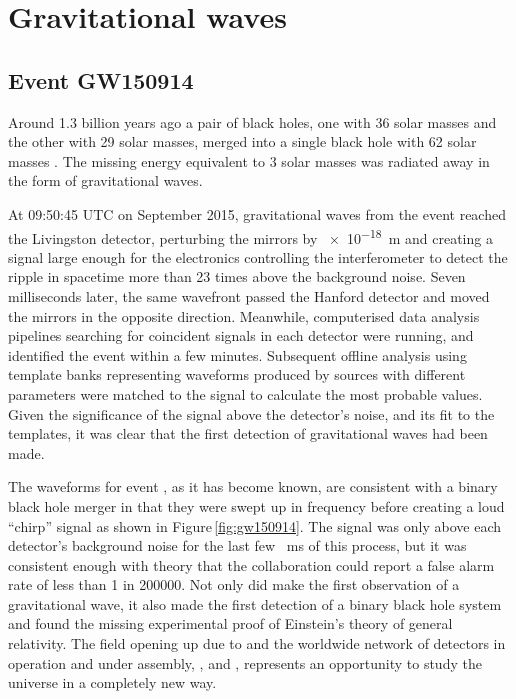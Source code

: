 \chapter{\label{c:gw-detection}Gravitational waves}

\section{Event GW150914}
Around \num{1.3} billion years ago a pair of black holes, one with \num{36} solar masses and the other with \num{29} solar masses, merged into a single black hole with \num{62} solar masses \cite{Abbott2016}. The missing energy equivalent to \num{3} solar masses was radiated away in the form of gravitational waves.

At 09:50:45 \gls{UTC} on  September 2015, gravitational waves from the event reached the \LIGO{} Livingston detector, perturbing the mirrors by \SI{e-18}{\meter} and creating a signal large enough for the electronics controlling the interferometer to detect the ripple in spacetime more than \num{23} times above the background noise. Seven milliseconds later, the same wavefront passed the \LIGO{} Hanford detector and moved the mirrors in the opposite direction. Meanwhile, computerised data analysis pipelines searching for coincident signals in each detector were running, and identified the event within a few minutes. Subsequent offline analysis using template banks representing waveforms produced by sources with different parameters were matched to the signal to calculate the most probable values. Given the significance of the signal above the detector's noise, and its fit to the templates, it was clear that the first detection of gravitational waves had been made.

The waveforms for event \emph{\GWFIRSTEVENT{}}, as it has become known, are consistent with a binary black hole merger in that they were swept up in frequency before creating a loud ``chirp'' signal as shown in Figure\,\ref{fig:gw150914}. The signal was only above each detector's background noise for the last few \SI{}{\milli\second} of this process, but it was consistent enough with theory that the collaboration could report a false alarm rate of less than \num{1} in \num{200000}. Not only did \LIGO{} make the first observation of a gravitational wave, it also made the first detection of a binary black hole system and found the missing experimental proof of Einstein's theory of general relativity. The field opening up due to \LIGO{} and the worldwide network of detectors in operation and under assembly, \GEO{}, \VIRGO{} and \KAGRA{}, represents an opportunity to study the universe in a completely new way.


